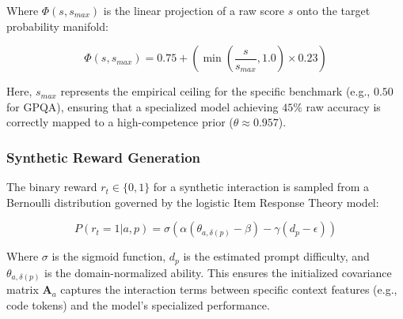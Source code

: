 Where $\Phi(s, s_{max})$ is the linear projection of a raw score $s$ onto the target probability manifold:

\begin{equation}
    \Phi(s, s_{max}) = 0.75 + \left( \min\left(\frac{s}{s_{max}}, 1.0\right) \times 0.23 \right)
\end{equation}

Here, $s_{max}$ represents the empirical ceiling for the specific benchmark (e.g., $0.50$ for GPQA), ensuring that a specialized model achieving $45\%$ raw accuracy is correctly mapped to a high-competence prior ($\theta \approx 0.957$).

\subsubsection{Synthetic Reward Generation}
The binary reward $r_{t} \in \{0,1\}$ for a synthetic interaction is sampled from a Bernoulli distribution governed by the logistic Item Response Theory model:

\begin{equation}
    P(r_{t}=1 | a, p) = \sigma \left( \alpha (\theta_{a, \delta(p)} - \beta) - \gamma(d_p - \epsilon) \right)
\end{equation}

Where $\sigma$ is the sigmoid function, $d_p$ is the estimated prompt difficulty, and $\theta_{a, \delta(p)}$ is the domain-normalized ability. This ensures the initialized covariance matrix $\mathbf{A}_a$ captures the interaction terms between specific context features (e.g., code tokens) and the model's specialized performance.